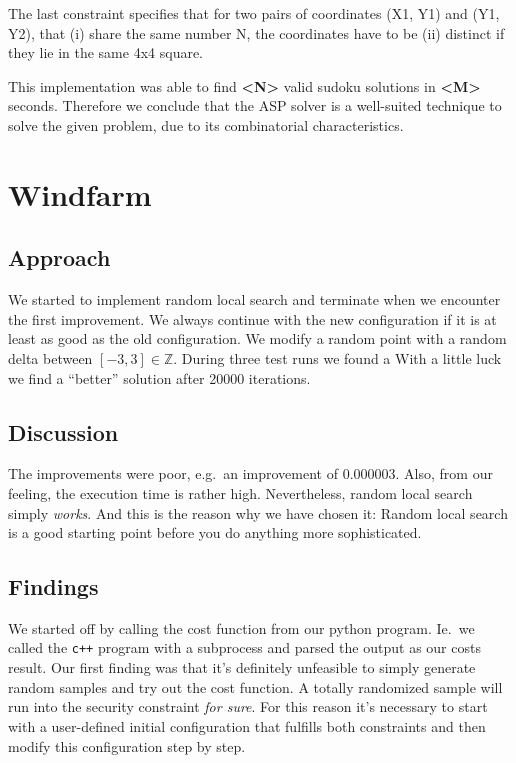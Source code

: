 \documentclass{article}
\begin{document}
The last constraint specifies that for two pairs of coordinates (X1, Y1) and (Y1, Y2), that (i) share the same number N, the coordinates have to be (ii) distinct if they lie in the same 4x4 square.

This implementation was able to find \textbf{\textless N\textgreater} valid sudoku solutions in \textbf{\textless M\textgreater} seconds. Therefore we conclude that the ASP solver is a well-suited technique to solve the given problem, due to its combinatorial characteristics.



\section{Windfarm}



\subsection{Approach}
We started to implement random local search and terminate when we encounter the first improvement.
We always continue with the new configuration if it is at least as good as the old configuration.
We modify a random point with a random delta between $[-3,3] \in \mathbb{Z}$.
During three test runs we found a With a little luck we find a ``better'' solution after 20000 iterations.

\subsection{Discussion}
The improvements were poor, e.g.\ an improvement of 0.000003.
Also, from our feeling, the execution time is rather high.
Nevertheless, random local search simply \emph{works}.
And this is the reason why we have chosen it:
Random local search is a good starting point before you do anything more sophisticated.


\subsection{Findings}
We started off by calling the cost function from our python program.
Ie.\ we called the \texttt{c++} program with a subprocess and parsed the output as our costs result.
Our first finding was that it's definitely unfeasible to simply generate random samples and try out the cost function.
A totally randomized sample will run into the security constraint \emph{for sure}.
For this reason it's necessary to start with a user-defined initial configuration that fulfills both constraints and then modify this configuration step by step.



\end{document}
